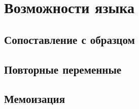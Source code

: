 \section{Возможности языка}
    \subsection{Сопоставление с образцом}
    \subsection{Повторные переменные}
    \subsection{Мемоизация}
